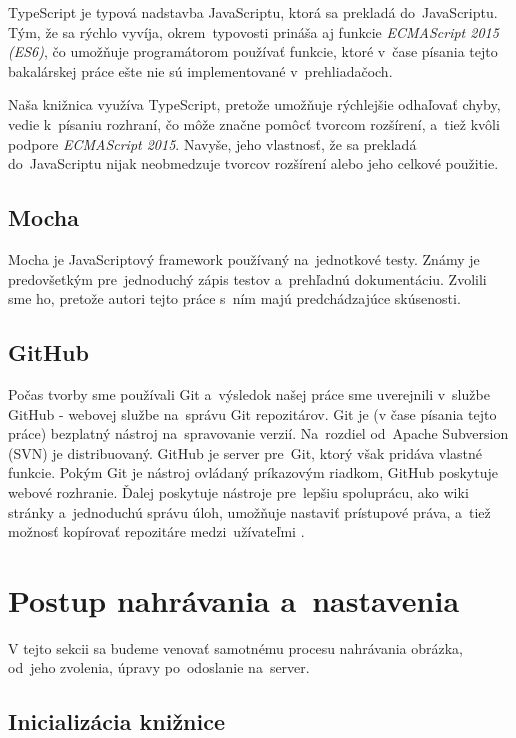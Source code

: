 TypeScript je typová nadstavba JavaScriptu, ktorá sa prekladá do~JavaScriptu. Tým, že sa rýchlo vyvíja, okrem~typovosti prináša aj funkcie \emph{ECMAScript 2015 (ES6)}, čo umožňuje programátorom používať funkcie, ktoré v~čase písania tejto bakalárskej práce ešte nie sú implementované v~prehliadačoch.

Naša knižnica využíva TypeScript, pretože umožňuje rýchlejšie odhaľovať chyby, vedie k~písaniu rozhraní, čo môže značne pomôcť tvorcom rozšírení, a~tiež kvôli podpore \emph{ECMAScript 2015}. Navyše, jeho vlastnosť, že sa prekladá do~JavaScriptu nijak neobmedzuje tvorcov rozšírení alebo jeho celkové použitie.

\subsection{Mocha}

Mocha je JavaScriptový framework používaný na~jednotkové testy. Známy je predovšetkým pre~jednoduchý zápis testov a~prehľadnú dokumentáciu. Zvolili sme ho, pretože autori tejto práce s~ním majú predchádzajúce skúsenosti.


\subsection{GitHub}

Počas tvorby sme používali Git a~výsledok našej práce sme uverejnili v~službe GitHub - webovej službe na~správu Git repozitárov. Git je (v čase písania tejto práce) bezplatný nástroj na~spravovanie verzií. Na~rozdiel od~Apache Subversion (SVN) je distribuovaný. GitHub je server pre~Git, ktorý však pridáva vlastné funkcie. Pokým Git je nástroj ovládaný príkazovým riadkom, GitHub poskytuje webové rozhranie. Ďalej poskytuje nástroje pre~lepšiu spoluprácu, ako wiki stránky a~jednoduchú správu úloh, umožňuje nastaviť prístupové práva, a~tiež možnosť kopírovať repozitáre medzi~užívateľmi \cite{Git_TechCrunch}. 


\section{Postup nahrávania a~nastavenia}
\label{sec:upload-and-settings}

V tejto sekcii sa budeme venovať samotnému procesu nahrávania obrázka, od~jeho zvolenia, úpravy po~odoslanie na~server.


\subsection{Inicializácia knižnice}
